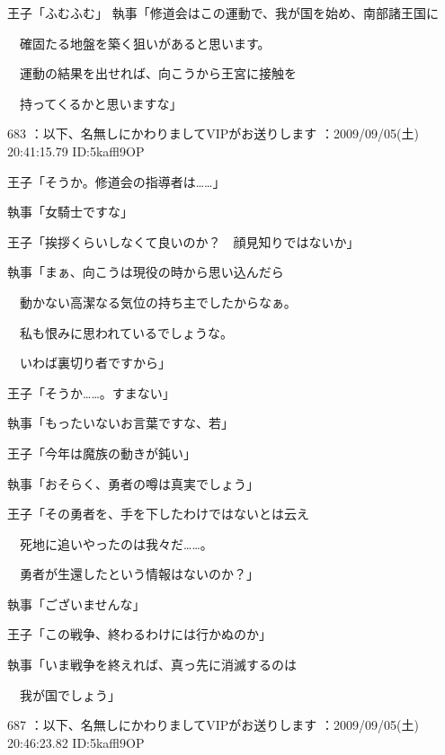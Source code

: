 \documentclass[a4j,twocolumn]{tarticle}
\begin{document}
王子「ふむふむ」 
執事「修道会はこの運動で、我が国を始め、南部諸王国に\par{} 
　確固たる地盤を築く狙いがあると思います。\par{} 
　運動の結果を出せれば、向こうから王宮に接触を\par{} 
　持ってくるかと思いますな」 

	
    
    

683 ：以下、名無しにかわりましてVIPがお送りします ：2009/09/05(土) 20:41:15.79 ID:5kaffl9OP 


王子「そうか。修道会の指導者は……」\par{} 
執事「女騎士ですな」 



王子「挨拶くらいしなくて良いのか？　顔見知りではないか」 



執事「まぁ、向こうは現役の時から思い込んだら\par{} 
　動かない高潔なる気位の持ち主でしたからなぁ。\par{} 
　私も恨みに思われているでしょうな。\par{} 
　いわば裏切り者ですから」 



王子「そうか……。すまない」\par{} 
執事「もったいないお言葉ですな、若」 



王子「今年は魔族の動きが鈍い」\par{} 
執事「おそらく、勇者の噂は真実でしょう」 



王子「その勇者を、手を下したわけではないとは云え\par{} 
　死地に追いやったのは我々だ……。 \par{}
　勇者が生還したという情報はないのか？」 



執事「ございませんな」 



王子「この戦争、終わるわけには行かぬのか」 



執事「いま戦争を終えれば、真っ先に消滅するのは\par{} 
　我が国でしょう」 

	
    
    

687 ：以下、名無しにかわりましてVIPがお送りします ：2009/09/05(土) 20:46:23.82 ID:5kaffl9OP 
\end{document}
